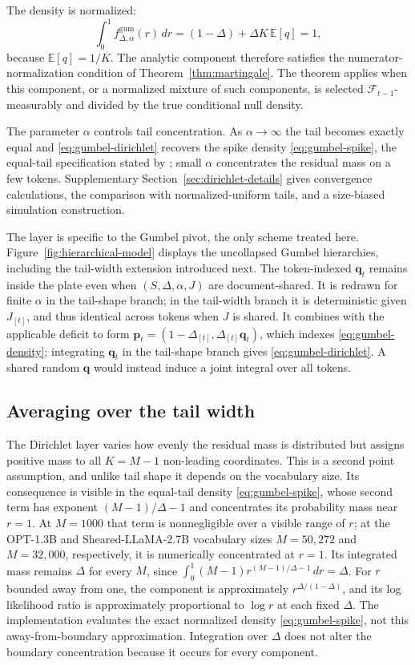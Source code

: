 \documentclass[11pt]{article}
\newcommand{\E}{\mathbb E}
\newcommand{\F}{\mathcal F}
\newcommand{\bP}{\bm p}
\begin{document}
The density is normalized:
\begin{equation}
  \int_0^1 f^{\mathrm{gum}}_{\Delta,\alpha}(r)\,dr
  =(1-\Delta)+\Delta K\,\E[q]=1,
\end{equation}
because $\E[q]=1/K$.  The analytic component therefore satisfies the numerator-normalization condition of Theorem~\ref{thm:martingale}.  The theorem applies when this component, or a normalized mixture of such components, is selected $\F_{t-1}$-measurably and divided by the true conditional null density.

The parameter $\alpha$ controls tail concentration.  As $\alpha\to\infty$ the tail becomes exactly equal and \eqref{eq:gumbel-dirichlet} recovers the spike density \eqref{eq:gumbel-spike}, the equal-tail specification stated by \citet{li2025framework}; small $\alpha$ concentrates the residual mass on a few tokens.  Supplementary Section~\ref{sec:dirichlet-details} gives convergence calculations, the comparison with normalized-uniform tails, and a size-biased simulation construction.

The layer is specific to the Gumbel pivot, the only scheme treated here.  Figure~\ref{fig:hierarchical-model} displays the uncollapsed Gumbel hierarchies, including the tail-width extension introduced next.  The token-indexed $\bm q_t$ remains inside the plate even when $(S,\Delta,\alpha,J)$ are document-shared.  It is redrawn for finite $\alpha$ in the tail-shape branch; in the tail-width branch it is deterministic given $J_{[t]}$, and thus identical across tokens when $J$ is shared.  It combines with the applicable deficit to form $\bP_t=(1-\Delta_{[t]},\Delta_{[t]}\bm q_t)$, which indexes \eqref{eq:gumbel-density}; integrating $\bm q_t$ in the tail-shape branch gives \eqref{eq:gumbel-dirichlet}.  A shared random $\bm q$ would instead induce a joint integral over all tokens.

\subsection{Averaging over the tail width}
\label{sec:tail-width}

The Dirichlet layer varies how evenly the residual mass is distributed but assigns
positive mass to all $K=M-1$ non-leading coordinates.  This is a second point
assumption, and unlike tail shape it depends on the vocabulary size.  Its
consequence is visible in the equal-tail density \eqref{eq:gumbel-spike}, whose
second term has exponent $(M-1)/\Delta-1$ and concentrates its probability mass near
$r=1$.  At $M=1000$ that term is nonnegligible over a visible range of $r$; at the
OPT-1.3B and Sheared-LLaMA-2.7B vocabulary sizes $M=50{,}272$ and $M=32{,}000$,
respectively, it is numerically concentrated
at $r=1$.  Its integrated mass remains $\Delta$ for every $M$, since
$\int_0^1(M-1)r^{(M-1)/\Delta-1}\,dr=\Delta$.  For $r$ bounded away from one, the
component is approximately $r^{\Delta/(1-\Delta)}$, and its log likelihood ratio is
approximately proportional to $\log r$ at each fixed $\Delta$.  The implementation
evaluates the exact normalized density \eqref{eq:gumbel-spike}, not this
away-from-boundary approximation.  Integration over $\Delta$ does not alter the
boundary concentration because it occurs for every component.
\end{document}
